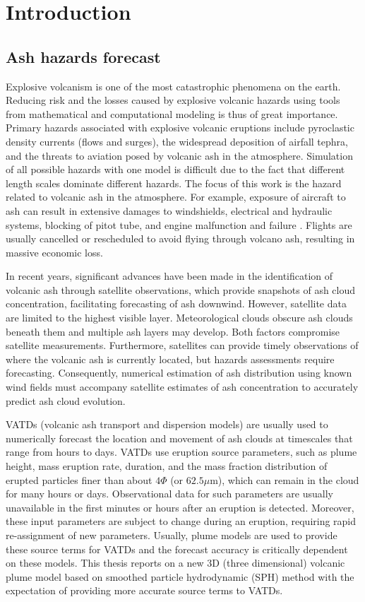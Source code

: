 \chapter{Introduction} \label{chapter:introduction}
\section{Ash hazards forecast}

Explosive volcanism is one of the most catastrophic
phenomena on the earth.
Reducing risk and the losses caused by explosive volcanic hazards using tools from mathematical and computational modeling is thus of great importance.
Primary hazards associated with explosive volcanic eruptions include pyroclastic density currents (flows and surges), the widespread deposition of airfall tephra, and the threats to aviation posed by volcanic ash in the atmosphere. Simulation of all possible hazards with one model is difficult due to the fact that different length scales dominate different hazards. The focus of this work is the hazard related to volcanic ash in the atmosphere. For example, exposure of aircraft to ash can result in extensive damages to windshields, electrical and hydraulic systems, blocking of pitot tube, and  engine malfunction and failure \citep{peterson2008forecasting}. Flights are usually cancelled or rescheduled to avoid flying through volcano ash, resulting in massive economic loss.

In recent years, significant advances have been made in the identification of volcanic ash through satellite observations, which provide snapshots of ash cloud concentration, facilitating forecasting of ash downwind.
However, satellite data are limited to the highest visible layer. Meteorological clouds obscure ash clouds beneath them and multiple ash layers may develop. Both factors compromise satellite measurements. Furthermore, satellites can provide timely observations of where the volcanic ash is currently located, but hazards assessments
require forecasting. Consequently, numerical estimation of ash distribution using known wind fields must accompany satellite estimates of ash concentration to accurately predict ash cloud evolution.

VATDs (volcanic ash transport and dispersion models) are usually used to numerically forecast the location and movement of ash clouds at timescales that range from hours to days. VATDs use eruption source parameters, such as plume height, mass eruption rate, duration, and the mass fraction distribution of erupted particles finer than about $4 \Phi$ (or $62.5 \mu$m), which can remain in the cloud for many hours or days. Observational data for such parameters are usually unavailable in the first minutes or hours after an eruption is detected. Moreover, these input parameters are subject to change during an eruption, requiring rapid re-assignment of new parameters. Usually, plume models are used to provide these source terms for VATDs and the forecast accuracy is critically dependent on these models. This thesis reports on a new 3D (three dimensional) volcanic plume model based on smoothed particle hydrodynamic (SPH) method with the expectation of providing more accurate source terms to VATDs.

